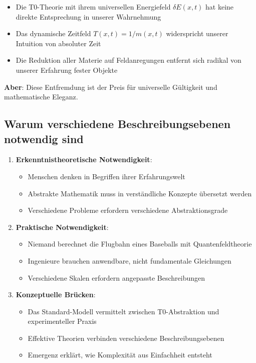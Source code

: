	\begin{itemize}
		\item Die T0-Theorie mit ihrem universellen Energiefeld $\delta E(x,t)$ hat keine direkte Entsprechung in unserer Wahrnehmung
		\item Das dynamische Zeitfeld $T(x,t) = 1/m(x,t)$ widerspricht unserer Intuition von absoluter Zeit
		\item Die Reduktion aller Materie auf Feldanregungen entfernt sich radikal von unserer Erfahrung fester Objekte
	\end{itemize}
	
	\textbf{Aber}: Diese Entfremdung ist der Preis für universelle Gültigkeit und mathematische Eleganz.
	
	\subsection{Warum verschiedene Beschreibungsebenen notwendig sind}
	
	\begin{enumerate}
		\item \textbf{Erkenntnistheoretische Notwendigkeit}:
		\begin{itemize}
			\item Menschen denken in Begriffen ihrer Erfahrungswelt
			\item Abstrakte Mathematik muss in verständliche Konzepte übersetzt werden
			\item Verschiedene Probleme erfordern verschiedene Abstraktionsgrade
		\end{itemize}
		
		\item \textbf{Praktische Notwendigkeit}:
		\begin{itemize}
			\item Niemand berechnet die Flugbahn eines Baseballs mit Quantenfeldtheorie
			\item Ingenieure brauchen anwendbare, nicht fundamentale Gleichungen
			\item Verschiedene Skalen erfordern angepasste Beschreibungen
		\end{itemize}
		
		\item \textbf{Konzeptuelle Brücken}:
		\begin{itemize}
			\item Das Standard-Modell vermittelt zwischen T0-Abstraktion und experimenteller Praxis
			\item Effektive Theorien verbinden verschiedene Beschreibungsebenen
			\item Emergenz erklärt, wie Komplexität aus Einfachheit entsteht
		\end{itemize}
	\end{enumerate}
	
